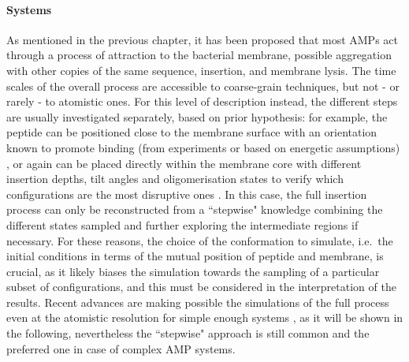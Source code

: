 \paragraph{Systems} As mentioned in the previous chapter, it has been proposed that most AMPs act through a process of attraction to the bacterial membrane, possible aggregation with other copies of the same sequence, insertion, and membrane lysis. The time scales of the overall process are accessible to coarse-grain techniques, but not - or rarely - to atomistic ones.
%
For this level of description instead, the different steps are usually investigated separately, based on prior hypothesis: for example, the peptide can be positioned close to the membrane surface with an orientation known to promote binding (from experiments or based on energetic assumptions) \cite{Wang2012}, or again can be placed directly within the membrane core with different insertion depths, tilt angles and oligomerisation states to verify which configurations are the most disruptive ones \cite{Lipkin2017}. In this case, the full insertion process can only be reconstructed from a ``stepwise" knowledge combining the different states sampled and further exploring the intermediate regions if necessary.
%
For these reasons, the choice of the conformation to simulate, i.e.\ the initial conditions in terms of the mutual position of peptide and membrane, is crucial, as it likely biases the simulation towards the sampling of a particular subset of configurations, and this must be considered in the interpretation of the results. Recent advances are making possible the simulations of the full process even at the atomistic resolution for simple enough systems \cite{Ulmschneider2017,Sun2015}, as it will be shown in the following, nevertheless the ``stepwise" approach is still common and the preferred one in case of complex AMP systems.

